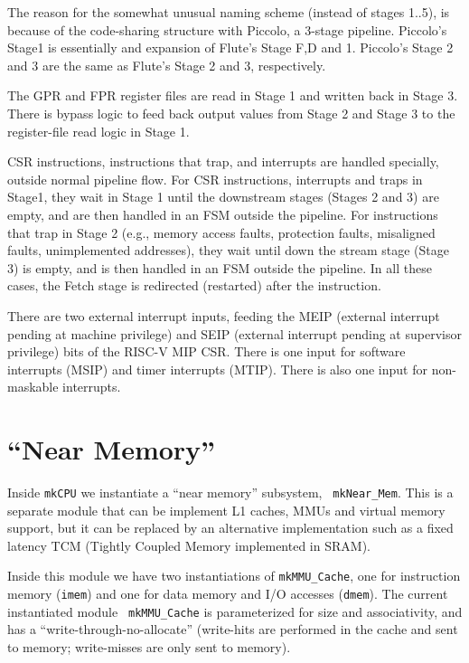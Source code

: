 \documentclass[11pt]{book}
\newcommand{\cf}{\footnotesize\tt}
\begin{document}
The reason for the somewhat unusual naming scheme (instead of stages
1..5), is because of the code-sharing structure with Piccolo, a
3-stage pipeline.  Piccolo's Stage1 is essentially and expansion of
Flute's Stage F,D and 1.  Piccolo's Stage 2 and 3 are the same as
Flute's Stage 2 and 3, respectively.

The GPR and FPR register files are read in Stage 1 and written back in
Stage 3.  There is bypass logic to feed back output values from Stage
2 and Stage 3 to the register-file read logic in Stage 1.

CSR instructions, instructions that trap, and interrupts are handled
specially, outside normal pipeline flow.  For CSR instructions,
interrupts and traps in Stage1, they wait in Stage 1 until the
downstream stages (Stages 2 and 3) are empty, and are then handled in
an FSM outside the pipeline.  For instructions that trap in Stage 2
(e.g., memory access faults, protection faults, misaligned faults,
unimplemented addresses), they wait until down the stream stage (Stage
3) is empty, and is then handled in an FSM outside the pipeline.  In
all these cases, the Fetch stage is redirected (restarted) after the
instruction.

There are two external interrupt inputs, feeding the MEIP (external
interrupt pending at machine privilege) and SEIP (external interrupt
pending at supervisor privilege) bits of the RISC-V MIP CSR.  There is
one input for software interrupts (MSIP) and timer interrupts (MTIP).
There is also one input for non-maskable interrupts.


\section{``Near Memory''}

Inside {\cf mkCPU} we instantiate a ``near memory'' subsystem, {\cf
mkNear\_Mem}.  This is a separate module that can be implement L1
caches, MMUs and virtual memory support, but it can be replaced by an
alternative implementation such as a fixed latency TCM (Tightly
Coupled Memory implemented in SRAM).

Inside this module we have two instantiations of {\cf mkMMU\_Cache},
one for instruction memory ({\cf imem}) and one for data memory and
I/O accesses ({\cf dmem}).  The current instantiated module {\cf
mkMMU\_Cache} is parameterized for size and associativity, and has a
``write-through-no-allocate'' (write-hits are performed in the cache
and sent to memory; write-misses are only sent to memory).
\end{document}

